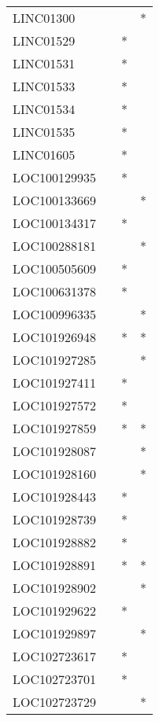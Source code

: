 \begin{longtable}{lccc}
LINC01300    &           &     &       * \\
LINC01529    &           &   * &         \\
LINC01531    &           &   * &         \\
LINC01533    &           &   * &         \\
LINC01534    &           &   * &         \\
LINC01535    &           &   * &         \\
LINC01605    &           &   * &         \\
LOC100129935 &           &   * &         \\
LOC100133669 &           &     &       * \\
LOC100134317 &           &   * &         \\
LOC100288181 &           &     &       * \\
LOC100505609 &           &   * &         \\
LOC100631378 &           &   * &         \\
LOC100996335 &           &     &       * \\
LOC101926948 &           &   * &       * \\
LOC101927285 &           &     &       * \\
LOC101927411 &           &   * &         \\
LOC101927572 &           &   * &         \\
LOC101927859 &           &   * &       * \\
LOC101928087 &           &     &       * \\
LOC101928160 &           &     &       * \\
LOC101928443 &           &   * &         \\
LOC101928739 &           &   * &         \\
LOC101928882 &           &   * &         \\
LOC101928891 &           &   * &       * \\
LOC101928902 &           &     &       * \\
LOC101929622 &           &   * &         \\
LOC101929897 &           &     &       * \\
LOC102723617 &           &   * &         \\
LOC102723701 &           &   * &         \\
LOC102723729 &           &     &       * \\

\end{longtable}
